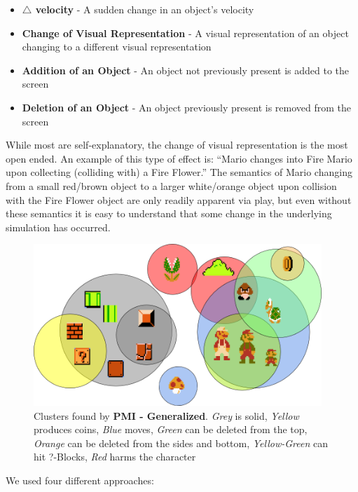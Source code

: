 \documentclass[a4paper]{article}
\begin{document}
\begin{itemize}
\item \textbf{$\triangle$ velocity} - A sudden change in an object's velocity
\item  \textbf{Change of Visual Representation} - A visual representation of an object changing to a different visual representation
\item \textbf{Addition of an Object} - An object not previously present is added to the screen
\item \textbf{Deletion of an Object} - An object previously present is removed from the screen
\end{itemize} 

While most are self-explanatory, the change of visual representation is the most open ended.  An example of this type of effect is: ``Mario changes into Fire Mario upon collecting (colliding with) a Fire Flower.'' The semantics of Mario changing from a small red/brown object to a larger white/orange object upon collision with the Fire Flower object are only readily apparent via play, but even without these semantics it is easy to understand that some change in the underlying simulation has occurred.  
\begin{figure}[ht]
\centering
    \includegraphics[width=0.97\textwidth]{figures/Clusters.png} 
   
    \caption{Clusters found by \textbf{PMI - Generalized}. \textit{Grey} is solid, \textit{Yellow} produces coins, \textit{Blue} moves, \textit{Green} can be deleted from the top, \textit{Orange} can be deleted from the sides and bottom, \textit{Yellow-Green} can hit ?-Blocks, \textit{Red} harms the character }
  \label{fig:Clusters}
  \end{figure}

We used four different approaches:
\end{document}
